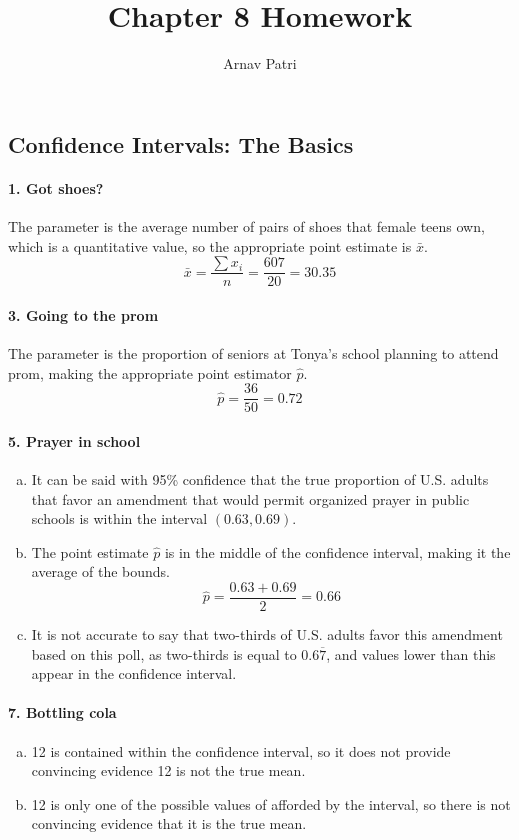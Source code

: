 \documentclass[12pt, A4]{article}
\title{Chapter 8 Homework}
\author{Arnav Patri}
\newcommand{\comment}[1]{}
\begin{document}
	\comment
	{
		\pagecolor{black}
		\color{white}
	}
	\maketitle
	\setcounter{section}{8}
	\subsection{Confidence Intervals: The Basics}
		\paragraph{1. Got shoes?}
			The parameter is the average number of pairs of shoes that female teens own, which is a quantitative value, so the appropriate point estimate is $\bar{x}$.
			\[
				\bar{x} = \frac{\sum x_i}{n} = \frac{607}{20} = 30.35
			\]
		\paragraph{3. Going to the prom}
			The parameter is the proportion of seniors at Tonya's school planning to attend prom, making the appropriate point estimator $\hat{p}$.
			\[
				\hat{p} = \frac{36}{50} = 0.72
			\]
		\paragraph{5. Prayer in school}
			\begin{enumerate}[a.]
				\item
					It can be said with 95\% confidence that the true proportion of U.S. adults that favor an amendment that would permit organized prayer in public schools is within the interval $(0.63, 0.69)$.
				\item
					The point estimate $\hat{p}$ is in the middle of the confidence interval, making it the average of the bounds.
					\[
						\hat{p} = \frac{0.63 + 0.69}{2} = 0.66
					\]
				\item
					It is not accurate to say that two-thirds of U.S. adults favor this amendment based on this poll, as two-thirds is equal to $0.6\overline{7}$, and values lower than this appear in the confidence interval.
			\end{enumerate}
		\paragraph{7. Bottling cola}
			\begin{enumerate}[a.]
				\item
					12 is contained within the confidence interval, so it does not provide convincing evidence 12 is not the true mean.
				\item
					12 is only one of the possible values of afforded by the interval, so there is not convincing evidence that it is the true mean.
			\end{enumerate}
\end{document}
